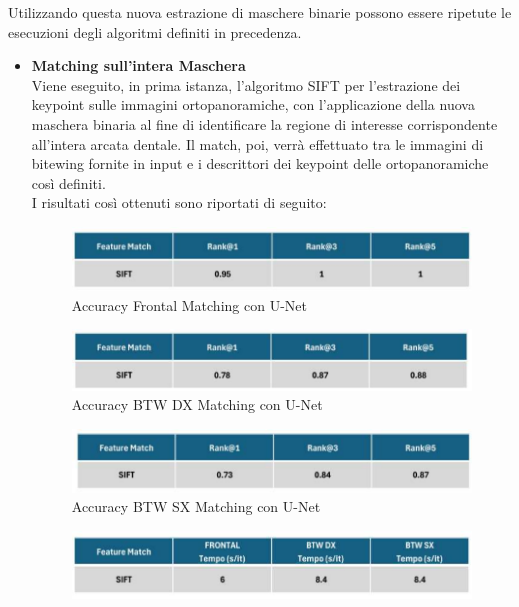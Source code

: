 \documentclass[12pt,a4paper,openright,twoside]{book}
\begin{document}
Utilizzando questa nuova estrazione di maschere binarie possono essere ripetute le esecuzioni degli algoritmi definiti in precedenza.\\

\begin{itemize}
\item \textbf{Matching sull'intera Maschera}\\
Viene eseguito, in prima istanza, l'algoritmo SIFT per l'estrazione dei keypoint sulle immagini ortopanoramiche, con l'applicazione della nuova maschera binaria al fine di identificare la regione di interesse corrispondente all'intera arcata dentale. Il match, poi, verrà effettuato tra le immagini di bitewing fornite in input e i descrittori dei keypoint delle ortopanoramiche così definiti.\\
I risultati così ottenuti sono riportati di seguito:
\begin{figure}[H]
	\centering
	\includegraphics{figures/frontal4.pdf}
   	\caption{Accuracy Frontal Matching con U-Net}
	\label{fig:frontal4}
\end{figure}
\begin{figure}[H]
	\centering
	\includegraphics{figures/dx4.pdf}
    	\caption{Accuracy BTW DX Matching con U-Net}
	\label{fig:dx4}
\end{figure}
\begin{figure}[H]
	\centering
	\includegraphics{figures/sx4.pdf}
    	\caption{Accuracy BTW SX Matching con U-Net}
	\label{fig:sx4}
\end{figure}
\begin{figure}[H]
	\centering
	\includegraphics{figures/tempi4.pdf}

\end{figure}
\end{itemize}
\end{document}

